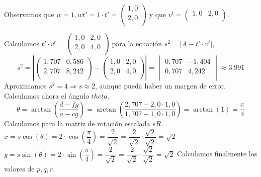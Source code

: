 \documentclass[12pt,a4paper]{article}
\begin{document}
	 Observamos que $w = 1, wt' = 1\cdot t'=\begin{pmatrix}
	 1,0\\
	 2,0\\
	 \end{pmatrix}$ y que $v^t=\begin{pmatrix}
	 1,0 & 2,0\\
	 \end{pmatrix}$.
	 
	 
	 Calculamos $t'\cdot v^t=\begin{pmatrix}
	 1,0 & 2,0\\
	 2,0 & 4,0\\
	 \end{pmatrix}$ para la ecuación $s^2=\vert A - t'\cdot v^t\vert$,\newline
	 $$
	 s^2 = \left\vert 
	 \begin{pmatrix}
	 1,707 & 0,586\\
	 2,707 & 8,242\\
	 \end{pmatrix}-\begin{pmatrix}
	 1,0 & 2,0\\
	 2,0 & 4,0\\
	 \end{pmatrix}\right\vert= 
	 \begin{vmatrix}
	 0,707 & -1,404\\
	 0,707 & 4,242\\
	 \end{vmatrix}\approx3.991$$
	 Aproximamos $s^2=4 \Rightarrow s\approx 2$, aunque pueda haber un margen de error.\newline
	 Calculamos ahora el ángulo $theta$.\newline
	 $$\theta=\arctan\left(\dfrac{d-fg}{a-cg}\right)=\arctan\left(\dfrac{2,707-2,0\cdot 1,0}{1,707-1,0\cdot 1,0}\right)=\arctan(1)=\dfrac{\pi}{4}$$
	 $$$$
	 Calculamos para la matriz de rotación escalada $sR$.\newline
	 $x=s\cos(\theta) = 2\cdot \cos\left(\dfrac{\pi}{4}\right)=\dfrac{2}{\sqrt{2}}=\dfrac{2}{\sqrt{2}}\cdot \dfrac{\sqrt{2}}{\sqrt{2}}=\sqrt{2} $
	 \newline
	 $y=s\sin(\theta) = 2\cdot \sin\left(\dfrac{\pi}{4}\right)=\dfrac{2}{\sqrt{2}}=\dfrac{2}{\sqrt{2}}\cdot \dfrac{\sqrt{2}}{\sqrt{2}}=\sqrt{2} $
	 \newline\newline
	 Calculamos finalmente los valores de $p,q,r$.\newline\newline
\end{document}

